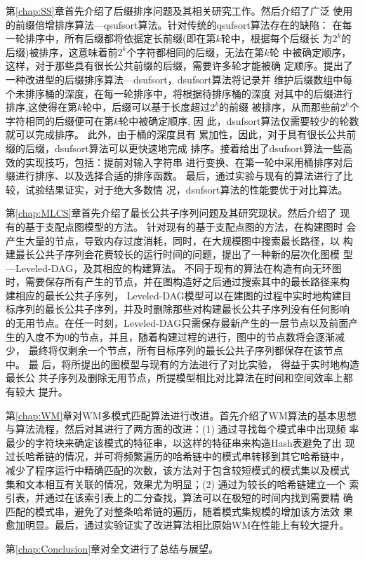 第\ref{chap:SS}章首先介绍了后缀排序问题及其相关研究工作。然后介绍了广泛
使用的前缀倍增排序算法---qsufsort算法。针对传统的qsufsort算法存在的缺陷：
在每一轮排序中，所有后缀都将依据定长前缀(即在第$k$轮中，根据每个后缀长
为$2^k$的后缀)被排序，这意味着前$2^k$个字符都相同的后缀，无法在第$k$轮
中被确定顺序，这样，对于那些具有很长公共前缀的后缀，需要许多轮才能被确
定顺序。提出了一种改进型的后缀排序算法---dsufsort，dsufsort算法将记录并
维护后缀数组中每个未排序桶的深度，在每一轮排序中，将根据待排序桶的深度
对其中的后缀进行排序,这使得在第$k$轮中，后缀可以基于长度超过$2^k$的前缀
被排序，从而那些前$2^k$个字符相同的后缀便可在第$k$轮中被确定顺序, 因
此，dsufsort算法仅需要较少的轮数就可以完成排序。 此外，由于桶的深度具有
累加性，因此，对于具有很长公共前缀的后缀，dsufsort算法可以更快速地完成
排序。接着给出了dsufsort算法一些高效的实现技巧，包括：提前对输入字符串
进行变换、在第一轮中采用桶排序对后缀进行排序、以及选择合适的排序函数。
最后，通过实验与现有的算法进行了比较，试验结果证实，对于绝大多数情
况，dsufsort算法的性能要优于对比算法。

第\ref{chap:MLCS}章首先介绍了最长公共子序列问题及其研究现状。然后介绍了
现有的基于支配点图模型的方法。 针对现有的基于支配点图的方法，在构建图时
会产生大量的节点，导致内存过度消耗，同时，在大规模图中搜索最长路径，以
构建最长公共子序列会花费较长的运行时间的问题，提出了一种新的层次化图模
型---Leveled-DAG，及其相应的构建算法。 不同于现有的算法在构造有向无环图
时，需要保存所有产生的节点，并在图构造好之后通过搜索其中的最长路径来构
建相应的最长公共子序列， Leveled-DAG模型可以在建图的过程中实时地构建目
标序列的最长公共子序列，并及时删除那些对构建最长公共子序列没有任何影响
的无用节点。在任一时刻，Leveled-DAG只需保存最新产生的一层节点以及前面产
生的入度不为0的节点，并且，随着构建过程的进行，图中的节点数将会逐渐减少，
最终将仅剩余一个节点，所有目标序列的最长公共子序列都保存在该节点中。 最
后，将所提出的图模型与现有的方法进行了对比实验， 得益于实时地构造最长公
共子序列及删除无用节点，所提模型相比对比算法在时间和空间效率上都有较大
提升。

第\ref{chap:WM}章对WM多模式匹配算法进行改进。首先介绍了WM算法的基本思想
与算法流程，然后对其进行了两方面的改进：(1) 通过寻找每个模式串中出现频
率最少的字符块来确定该模式的特征串，以这样的特征串来构造Hash表避免了出
现过长哈希链的情况，并可将频繁遍历的哈希链中的模式串转移到其它哈希链中，
减少了程序运行中精确匹配的次数，该方法对于包含较短模式的模式集以及模式
集和文本相互有关联的情况，效果尤为明显；(2) 通过为较长的哈希链建立一个
索引表，并通过在该索引表上的二分查找，算法可以在极短的时间内找到需要精
确匹配的模式串，避免了对整条哈希链的遍历，随着模式集规模的增加该方法效
果愈加明显。最后，通过实验证实了改进算法相比原始WM在性能上有较大提升。

第\ref{chap:Conclusion}章对全文进行了总结与展望。
